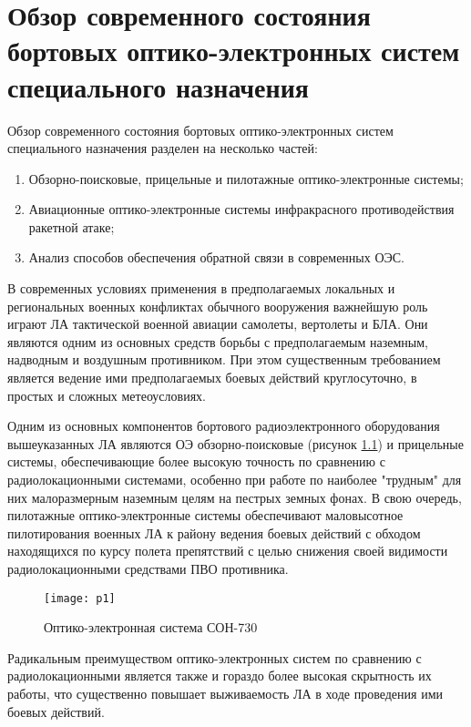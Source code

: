 \chapter{Обзор современного состояния бортовых оптико-электронных систем специального назначения} \label{ch:ch1}

Обзор современного состояния бортовых оптико-электронных систем специального назначения разделен на несколько частей:
\begin{enumerate}
  \item Обзорно-поисковые, прицельные и пилотажные оптико-электронные системы;
  \item Авиационные оптико-электронные системы инфракрасного противодействия ракетной атаке;
  \item Анализ способов обеспечения обратной связи в современных ОЭС.
\end{enumerate}

В современных условиях применения в предполагаемых локальных и региональных военных конфликтах обычного вооружения важнейшую роль играют ЛА тактической военной авиации самолеты, вертолеты и БЛА. Они являются одним из основных средств борьбы с предполагаемым наземным, надводным и воздушным противником. При этом существенным требованием является ведение ими предполагаемых боевых действий круглосуточно, в простых и сложных метеоусловиях. 

Одним из основных компонентов бортового радиоэлектронного оборудования вышеуказанных ЛА являются ОЭ обзорно-поисковые 
(рисунок \ref{fig:soep}) и прицельные системы, обеспечивающие более высокую точность по сравнению с радиолокационными системами, особенно при работе по наиболее "трудным" для них малоразмерным наземным целям на пестрых земных фонах. В свою очередь, пилотажные оптико-электронные системы обеспечивают маловысотное пилотирования военных ЛА к району ведения боевых действий с обходом находящихся по курсу полета препятствий с целью снижения своей видимости радиолокационными средствами ПВО противника.

\begin{figure}[ht]
	\centering
  \texttt{[image: p1]} 
  \caption{Оптико-электронная система СОН-730}
  \label{fig:soep}
\end{figure}

Радикальным преимуществом оптико-электронных систем по сравнению с радиолокационными является также и гораздо более высокая скрытность их работы, что существенно повышает выживаемость ЛА в ходе проведения ими боевых действий. 


